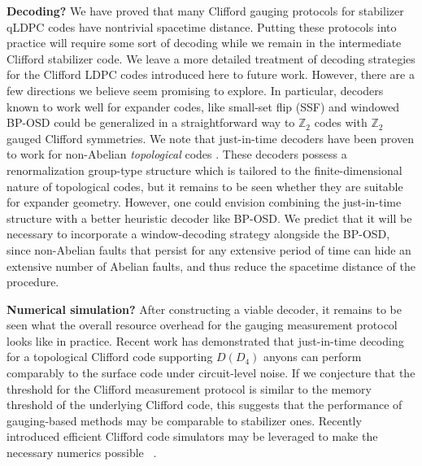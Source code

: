 \textbf{Decoding? }We have proved that many Clifford gauging protocols for stabilizer qLDPC codes have nontrivial spacetime distance. Putting these protocols into practice will require some sort of decoding while we remain in the intermediate Clifford stabilizer code. We leave a more detailed treatment of decoding strategies for the Clifford LDPC codes introduced here to future work. However, there are a few directions we believe seem promising to explore. In particular, decoders known to work well for expander codes, like small-set flip (SSF) \cite{Leverrier_2015,Fawzi_2018_2,Fawzi_2018} and windowed BP-OSD \cite{Panteleev_2021, roffe2020, huang2023improvednoisysyndromedecoding, gong2024lowlatencyiterativedecodingqldpc} could be generalized in a straightforward way to $\mathbb{Z}_2$ codes with $\mathbb{Z}_2$ gauged Clifford symmetries. We note that just-in-time decoders have been proven to work for non-Abelian \emph{topological} codes \cite{davydova2025universal, lyons2026}. These decoders possess a renormalization group-type structure which is tailored to the finite-dimensional nature of topological codes, but it remains to be seen whether they are suitable for expander geometry. However, one could envision combining the just-in-time structure with a better heuristic decoder like BP-OSD. We predict that it will be necessary to incorporate a window-decoding strategy alongside the BP-OSD, since non-Abelian faults that persist for any extensive period of time can hide an extensive number of Abelian faults, and thus reduce the spacetime distance of the procedure. 

\textbf{Numerical simulation? }After constructing a viable decoder, it remains to be seen what the overall resource overhead for the gauging measurement protocol looks like in practice. Recent work \cite{delafuente2026highthresholddecodingnonpaulicodes} has demonstrated that just-in-time decoding for a topological Clifford code supporting $D(D_4)$ anyons can perform comparably to the surface code under circuit-level noise. If we conjecture that the threshold for the Clifford measurement protocol is similar to the memory threshold of the underlying Clifford code, this suggests that the performance of gauging-based methods may be comparable to stabilizer ones. Recently introduced efficient Clifford code simulators may be leveraged to make the necessary numerics possible ~\cite{takada2026exactefficientsimulationnoisy, Surti_2026,delafuente2026efficientlyestimatingfailurerates}. 

